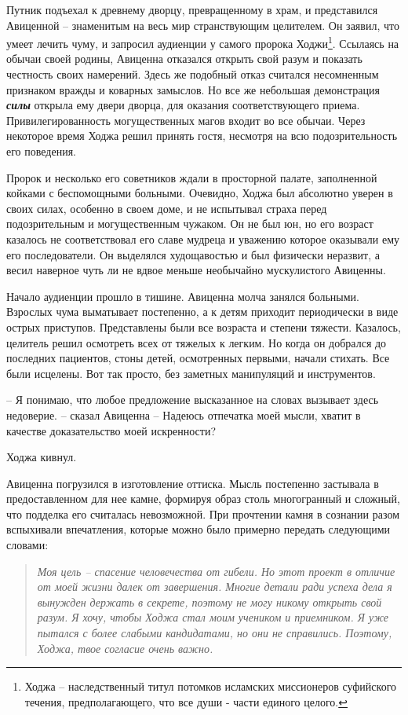 \documentclass[12pt,a4paper]{article}
\begin{document}
Путник подъехал к древнему дворцу, превращенному в храм, и представился Авиценной -- знаменитым на весь мир странствующим целителем. Он заявил, что умеет лечить чуму, и запросил аудиенции у самого пророка Ходжи\footnote{Ходжа -- наследственный титул потомков исламских миссионеров суфийского течения, предполагающего, что все души - части единого целого.}. Ссылаясь на обычаи своей родины, Авиценна отказался открыть свой разум и показать честность своих намерений. Здесь же подобный отказ считался несомненным признаком вражды и коварных замыслов. Но все же небольшая демонстрация \textbf{\textit{силы}} открыла ему двери дворца, для оказания соответствующего приема. Привилегированность могущественных магов входит во все обычаи. Через некоторое время Ходжа решил принять гостя, несмотря на всю подозрительность его поведения.

Пророк и несколько его советников ждали в просторной палате, заполненной койками с беспомощными больными. Очевидно, Ходжа был абсолютно уверен в своих силах, особенно в своем доме, и не испытывал страха перед подозрительным и могущественным чужаком. Он не был юн, но его возраст казалось не соответствовал его славе мудреца и уважению которое оказывали ему его последователи. Он выделялся худощавостью и был физически неразвит, а весил наверное чуть ли не вдвое меньше необычайно мускулистого Авиценны. 

Начало аудиенции прошло в тишине. Авиценна молча занялся больными. Взрослых чума выматывает постепенно, а к детям приходит периодически в виде острых приступов. Представлены были все возраста и степени тяжести. Казалось, целитель решил осмотреть всех от тяжелых к легким. Но когда он добрался до последних пациентов, стоны детей, осмотренных первыми, начали стихать. Все были исцелены. Вот так просто, без заметных манипуляций и инструментов.

-- Я понимаю, что любое предложение высказанное на словах вызывает здесь недоверие. -- сказал Авиценна -- Надеюсь отпечатка моей мысли, хватит в качестве доказательство моей искренности?

Ходжа кивнул.

Авиценна погрузился в изготовление оттиска. Мысль постепенно застывала в предоставленном для нее камне, формируя образ столь многогранный и сложный, что подделка его считалась невозможной. При прочтении камня в сознании разом вспыхивали впечатления, которые можно было примерно передать следующими словами:

\begin{quotation}
	\textit{Моя цель -- спасение человечества от гибели. Но этот проект в отличие от моей жизни далек от завершения. Многие детали ради успеха дела я вынужден держать в секрете, поэтому не могу никому открыть свой разум. Я хочу, чтобы Ходжа стал моим учеником и приемником. Я уже пытался с более слабыми кандидатами, но они не справились. Поэтому, Ходжа, твое согласие очень важно.}
\end{quotation}
\end{document}
